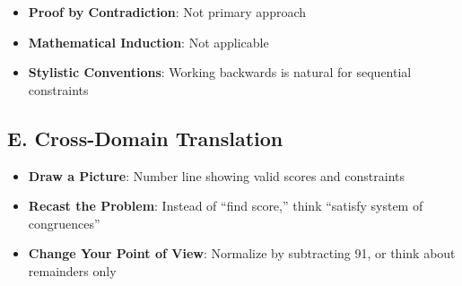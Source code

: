 \documentclass[11pt]{article}
\begin{document}
\begin{strategicbox}
\begin{itemize}[leftmargin=*]
    \item \textbf{Proof by Contradiction}: Not primary approach
    
    \item \textbf{Mathematical Induction}: Not applicable
    
    \item \textbf{Stylistic Conventions}: Working backwards is natural for sequential constraints
\end{itemize}

\subsection*{E. Cross-Domain Translation}
\begin{itemize}[leftmargin=*]
    \item \textbf{Draw a Picture}: Number line showing valid scores and constraints
    
    \item \textbf{Recast the Problem}: Instead of ``find score,'' think ``satisfy system of congruences''
    
    \item \textbf{Change Your Point of View}: Normalize by subtracting 91, or think about remainders only
\end{itemize}
\end{strategicbox}
\end{document}

